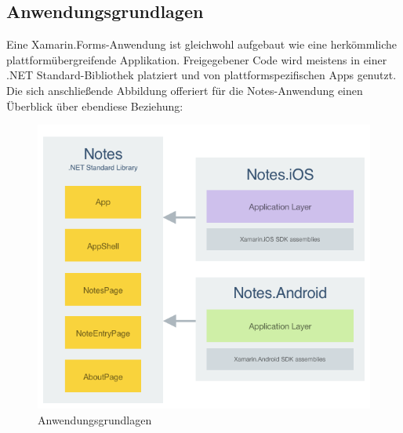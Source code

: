 \subsection{Anwendungsgrundlagen}
Eine Xamarin.Forms-Anwendung ist gleichwohl aufgebaut wie eine herkömmliche plattformübergreifende Applikation. Freigegebener Code wird meistens in einer .NET Standard-Bibliothek platziert und von plattformspezifischen Apps genutzt. Die sich anschließende Abbildung offeriert für die Notes-Anwendung einen Überblick über ebendiese Beziehung:
\begin{figure}[h]
    \begin{center}\includegraphics[width=14cm]{pics/Frontend architecture.png}
    \caption[Anwendungsgrundlagen Ansicht]{Anwendungsgrundlagen}
    \end{center}
\end{figure}